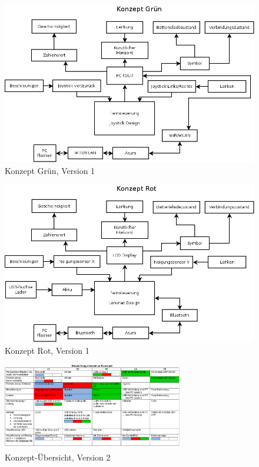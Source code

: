 \begin{figure}
	\centering
	\includegraphics[width=\textwidth]{konzepte_v1/Konzept_Gruen.png}
	\caption{Konzept Grün, Version 1}
	\label{fig:gruen_v1}
\end{figure}

\begin{figure}
	\centering
	\includegraphics[width=\textwidth]{konzepte_v1/Konzept_Rot.png}
	\caption{Konzept Rot, Version 1}
	\label{fig:rot_v1}
\end{figure}

\begin{figure}
	\centering
	\includegraphics[angle=90, width=0.7\textwidth]{konzepte_v2/Konzepte.pdf}
	\caption{Konzept-Übersicht, Version 2}
	\label{fig:konzepte}
\end{figure}

